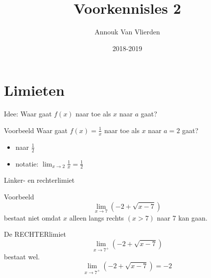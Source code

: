 \documentclass[handout]{beamer}
\title{Voorkennisles 2}
\author{Annouk Van Vlierden}
\date{2018-2019}
\newcommand{\ds}{\displaystyle}
\begin{document}
\begin{frame}
  \titlepage
\end{frame}



\section{Limieten}

\begin{frame}{Idee: Waar gaat $f(x)$ naar toe als $x$ naar $a$ gaat?}
\begin{exampleblock}{Voorbeeld}
Waar gaat $f(x)=\frac{1}{x}$ naar toe als $x$ naar $a=2$ gaat?
\begin{itemize}
	\item naar $\ds \frac{1}{2}$
	\item notatie:   $\displaystyle{\lim_{x \rightarrow 2}} \frac{1}{x} = \frac{1}{2} $
\end{itemize}


\end{exampleblock}

\end{frame}

\begin{frame}{Linker- en rechterlimiet}
\begin{exampleblock}{Voorbeeld}
$$\lim_{x \to 7} (-2 + \sqrt{x-7})$$ bestaat niet omdat $x$ alleen langs rechts $(x>7)$ naar 7 kan gaan.

De RECHTERlimiet $$\displaystyle \lim_{x  \to 7^+} (-2 + \sqrt{x-7}) $$ bestaat wel.  
$$\displaystyle \lim_{x  \to 7^+} (-2 + \sqrt{x-7})=-2 $$
\end{exampleblock}
\end{frame}
\end{document}
